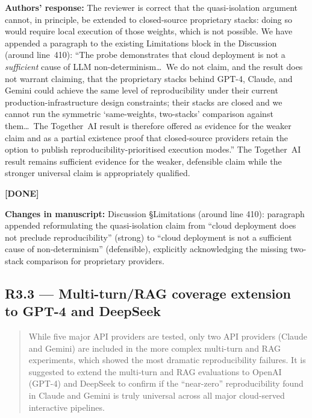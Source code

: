 \documentclass[11pt,a4paper]{article}
\newenvironment{revquote}{%
  \begin{quote}\small\itshape\color{revgray}
}{%
  \end{quote}
}
\newcommand{\response}[1]{\par\noindent\textbf{\color{revgreen}Authors' response:} #1\par}
\newcommand{\changes}[1]{\par\noindent\textbf{\color{revblue}Changes in manuscript:} #1\par}
\newcommand{\done}{\color{revgreen}\textbf{[DONE]}}
\begin{document}
\response{The reviewer is correct that the quasi-isolation argument cannot, in principle, be extended to closed-source proprietary stacks: doing so would require local execution of those weights, which is not possible. We have appended a paragraph to the existing Limitations block in the Discussion (around line~410): ``The probe demonstrates that cloud deployment is not a \emph{sufficient} cause of LLM non-determinism\ldots\ We do not claim, and the result does not warrant claiming, that the proprietary stacks behind GPT-4, Claude, and Gemini could achieve the same level of reproducibility under their current production-infrastructure design constraints; their stacks are closed and we cannot run the symmetric `same-weights, two-stacks' comparison against them\ldots\ The Together~AI result is therefore offered as evidence for the weaker claim and as a partial existence proof that closed-source providers retain the option to publish reproducibility-prioritised execution modes.'' The Together~AI result remains sufficient evidence for the weaker, defensible claim while the stronger universal claim is appropriately qualified.} \done

\changes{Discussion §Limitations (around line 410): paragraph appended reformulating the quasi-isolation claim from ``cloud deployment does not preclude reproducibility'' (strong) to ``cloud deployment is not a sufficient cause of non-determinism'' (defensible), explicitly acknowledging the missing two-stack comparison for proprietary providers.}

\subsection*{R3.3 --- Multi-turn/RAG coverage extension to GPT-4 and DeepSeek}

\begin{revquote}
While five major API providers are tested, only two API providers (Claude and Gemini) are included in the more complex multi-turn and RAG experiments, which showed the most dramatic reproducibility failures. It is suggested to extend the multi-turn and RAG evaluations to OpenAI (GPT-4) and DeepSeek to confirm if the ``near-zero'' reproducibility found in Claude and Gemini is truly universal across all major cloud-served interactive pipelines.
\end{revquote}
\end{document}
